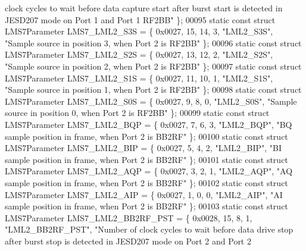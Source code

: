 \begin{DoxyCode}
{       clock cycles to wait before data capture start after burst start is detected in JESD207 mode on Port 1 and Port
       1 RF2BB"} \};
00095 \textcolor{keyword}{static} \textcolor{keyword}{const} \textcolor{keyword}{struct }LMS7Parameter LMS7_LML2_S3S = \{ 0x0027, 15, 14, 3, \textcolor{stringliteral}{"LML2\_S3S"}, \textcolor{stringliteral}{"Sample source in
       position 3, when Port 2 is RF2BB"} \};
00096 \textcolor{keyword}{static} \textcolor{keyword}{const} \textcolor{keyword}{struct }LMS7Parameter LMS7_LML2_S2S = \{ 0x0027, 13, 12, 2, \textcolor{stringliteral}{"LML2\_S2S"}, \textcolor{stringliteral}{"Sample source in
       position 2, when Port 2 is RF2BB"} \};
00097 \textcolor{keyword}{static} \textcolor{keyword}{const} \textcolor{keyword}{struct }LMS7Parameter LMS7_LML2_S1S = \{ 0x0027, 11, 10, 1, \textcolor{stringliteral}{"LML2\_S1S"}, \textcolor{stringliteral}{"Sample source in
       position 1, when Port 2 is RF2BB"} \};
00098 \textcolor{keyword}{static} \textcolor{keyword}{const} \textcolor{keyword}{struct }LMS7Parameter LMS7_LML2_S0S = \{ 0x0027, 9, 8, 0, \textcolor{stringliteral}{"LML2\_S0S"}, \textcolor{stringliteral}{"Sample source in position
       0, when Port 2 is RF2BB"} \};
00099 \textcolor{keyword}{static} \textcolor{keyword}{const} \textcolor{keyword}{struct }LMS7Parameter LMS7_LML2_BQP = \{ 0x0027, 7, 6, 3, \textcolor{stringliteral}{"LML2\_BQP"}, \textcolor{stringliteral}{"BQ sample position in
       frame, when Port 2 is BB2RF"} \};
00100 \textcolor{keyword}{static} \textcolor{keyword}{const} \textcolor{keyword}{struct }LMS7Parameter LMS7_LML2_BIP = \{ 0x0027, 5, 4, 2, \textcolor{stringliteral}{"LML2\_BIP"}, \textcolor{stringliteral}{"BI sample position in
       frame, when Port 2 is BB2RF"} \};
00101 \textcolor{keyword}{static} \textcolor{keyword}{const} \textcolor{keyword}{struct }LMS7Parameter LMS7_LML2_AQP = \{ 0x0027, 3, 2, 1, \textcolor{stringliteral}{"LML2\_AQP"}, \textcolor{stringliteral}{"AQ sample position in
       frame, when Port 2 is BB2RF"} \};
00102 \textcolor{keyword}{static} \textcolor{keyword}{const} \textcolor{keyword}{struct }LMS7Parameter LMS7_LML2_AIP = \{ 0x0027, 1, 0, 0, \textcolor{stringliteral}{"LML2\_AIP"}, \textcolor{stringliteral}{"AI sample position in
       frame, when Port 2 is BB2RF"} \};
00103 \textcolor{keyword}{static} \textcolor{keyword}{const} \textcolor{keyword}{struct }LMS7Parameter LMS7_LML2_BB2RF_PST = \{ 0x0028, 15, 8, 1, \textcolor{stringliteral}{"LML2\_BB2RF\_PST"}, \textcolor{stringliteral}{"Number of
       clock cycles to wait before data drive stop after burst stop is detected in JESD207 mode on Port 2 and Port 2
}
\end{DoxyCode}
